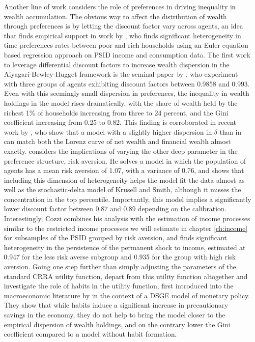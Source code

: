 Another line of work considers the role of preferences in driving inequality in 
wealth accumulation. The obvious way to affect the distribution of wealth through
preferences is by letting the discount factor vary across agents, an idea that 
finds empirical support in work by \citet{Lawrance1991}, who finds significant
heterogeneity in time preferences rates between poor and rich households using 
an Euler equation based regression approach on PSID income and consumption data.
The first work to leverage differential discount factors to increase wealth 
dispersion in the Aiyagari-Bewley-Hugget framework is the seminal paper by
\citet{KrusellSmith1998}, who experiment with three groups of agents exhibiting
discount factors between 0.9858 and 0.993. Even with this seemingly small dispersion
in preferences, the inequality in wealth holdings in the model rises dramatically,
with the share of wealth held by the richest 1\% of households increasing from 
three to 24 percent, and the Gini coefficient increasing from 0.25 to 0.82.
This finding is corroborated in recent work by \citet{CarrollSlacalekTokuoka2014AER},
who show that a model with a slightly higher dispersion in $\delta$ than in 
\citet{KrusellSmith1998} can match both the Lorenz curve of net wealth and 
financial wealth almost exactly. \citet{Cozzi2014} considers the implications of
varying the other deep parameter in the preference structure, risk aversion. He
 solves a model in which the population of agents has a mean risk aversion of 
1.07, with a variance of 0.76, and shows that including this dimension of 
heterogeneity helps the model fit the data almost as well as the stochastic-delta
model of Krusell and Smith, although it misses the concentration in the top 
percentile. Importantly, this model implies a significantly lower discount 
factor between 0.87 and 0.89 depending on the calibration. Interestingly, Cozzi 
combines his analysis with the estimation of income processes similar to the 
restricted income processes we will estimate in chapter \ref{ch:income} for 
subsamples of the PSID grouped by risk aversion, and finds significant 
heterogeneity in the persistence of the permanent shock to income, estimated at 
0.947 for the less risk averse subgroup and 0.935 for the group with high 
risk aversion. 
Going one step further than simply adjusting the parameters of the standard 
CRRA utility function, \citet{DPMRR2003} depart from this utility function 
altogether and investigate the role of habits in the utility function, first 
introduced into the macroeconomic literature by \citet{Fuhrer2000} in the 
context of a DSGE model of monetary policy. They show that while habits induce
a significant increase in precautionary savings in the economy, they do not 
help to bring the model closer to the empirical dispersion of wealth holdings,
and on the contrary lower the Gini coefficient compared to a model without 
habit formation. 


